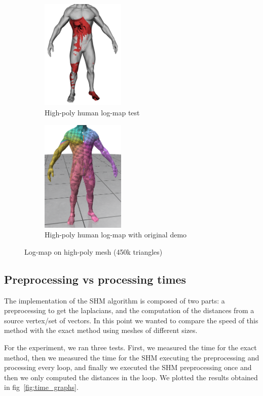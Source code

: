 \documentclass[sigconf, nonacm]{acmart}
\begin{document}
\begin{figure}[htbp]
  \centering
  \hfill
  \begin{subfigure}[b]{0.23\textwidth}
    \centering
    \includegraphics[width=4cm]{human_spiderman_high.png}
    \caption{High-poly human log-map test}
    \label{fig:high_poly_human}
  \end{subfigure}
  \begin{subfigure}[b]{0.23\textwidth}
    \centering
    \includegraphics[width=4cm]{log_map_wrong.png}
    \caption{High-poly human log-map with original demo}
    \label{fig:high_poly_human_original_demo}
  \end{subfigure}
  \caption{Log-map on high-poly mesh (450k triangles)}
  \label{fig:cut_locus_vectors}
\end{figure}

\subsection{Preprocessing vs processing times}

The implementation of the SHM algorithm is composed of two parts:
a preprocessing to get the laplacians, and the computation of the 
distances from a source vertex/set of vectors. In this point we wanted to compare the speed of this method with
the exact method using meshes of different sizes. 

For the experiment, we ran three tests. First, we measured the time for the exact method,
then we measured the time for the SHM executing the preprocessing and processing
every loop, and finally we executed the SHM preprocessing once and then we only computed
the distances in the loop. We plotted the results obtained in fig~\ref{fig:time_graphs}. 
\end{document}
